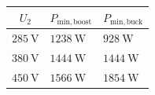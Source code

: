 \begin{solutiontable}[htb]
	\centering  %
	\begin{tabular}{lll}
		\toprule
		\multicolumn{1}{c}{$U_\mathrm{2}$} & \multicolumn{1}{c}{$P_\mathrm{min,boost}$}
		                                   & \multicolumn{1}{c}{$P_\mathrm{min,buck}$}                       \\
		\midrule
		$\SI{285}{\volt}$                  & $\SI{1238}{\watt}$                         & $\SI{928}{\watt}$  \\
		$\SI{380}{\volt}$                  & $\SI{1444}{\watt}$                         & $\SI{1444}{\watt}$ \\
		$\SI{450}{\volt}$                  & $\SI{1566}{\watt}$                         & $\SI{1854}{\watt}$ \\
		\bottomrule
	\end{tabular}
	\caption{Minimal power necessary for BCM (boost and buck stage).}
	\label{table:PowerminInputOutputStage}
\end{solutiontable}

